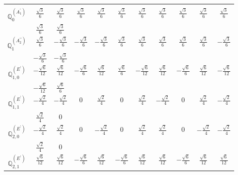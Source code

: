 \documentclass[fleqn,10pt,landscape]{article}
\begin{document}
\begin{itemize}
{\begin{center}
\begin{longtable}{ccccccccccc}
 \hline \hline
\multicolumn{10}{r}{} \\ \endlastfoot

$\mathbb{Q}_{0}^{(A_{1}^{\prime})}$ & $ \frac{\sqrt{3}}{6} $ & $ \frac{\sqrt{3}}{6} $ & $ \frac{\sqrt{3}}{6} $ & $ \frac{\sqrt{3}}{6} $ & $ \frac{\sqrt{3}}{6} $ & $ \frac{\sqrt{3}}{6} $ & $ \frac{\sqrt{3}}{6} $ & $ \frac{\sqrt{3}}{6} $ & $ \frac{\sqrt{3}}{6} $ & $ \frac{\sqrt{3}}{6} $ \\
& $ \frac{\sqrt{3}}{6} $ & $ \frac{\sqrt{3}}{6} $ & $  $ & $  $ & $  $ & $  $ & $  $ & $  $ & $  $ & $  $ \\ \hline
$\mathbb{Q}_{1}^{(A_{2}^{\prime\prime})}$ & $ \frac{\sqrt{3}}{6} $ & $ - \frac{\sqrt{3}}{6} $ & $ - \frac{\sqrt{3}}{6} $ & $ - \frac{\sqrt{3}}{6} $ & $ \frac{\sqrt{3}}{6} $ & $ \frac{\sqrt{3}}{6} $ & $ \frac{\sqrt{3}}{6} $ & $ \frac{\sqrt{3}}{6} $ & $ \frac{\sqrt{3}}{6} $ & $ - \frac{\sqrt{3}}{6} $ \\
& $ - \frac{\sqrt{3}}{6} $ & $ - \frac{\sqrt{3}}{6} $ & $  $ & $  $ & $  $ & $  $ & $  $ & $  $ & $  $ & $  $ \\ \hline
$\mathbb{Q}_{1,0}^{(E^{\prime})}$ & $ - \frac{\sqrt{6}}{12} $ & $ \frac{\sqrt{6}}{12} $ & $ - \frac{\sqrt{6}}{6} $ & $ \frac{\sqrt{6}}{12} $ & $ \frac{\sqrt{6}}{6} $ & $ - \frac{\sqrt{6}}{12} $ & $ \frac{\sqrt{6}}{12} $ & $ - \frac{\sqrt{6}}{6} $ & $ \frac{\sqrt{6}}{12} $ & $ - \frac{\sqrt{6}}{12} $ \\
& $ - \frac{\sqrt{6}}{12} $ & $ \frac{\sqrt{6}}{6} $ & $  $ & $  $ & $  $ & $  $ & $  $ & $  $ & $  $ & $  $ \\ \hline
$\mathbb{Q}_{1,1}^{(E^{\prime})}$ & $ - \frac{\sqrt{2}}{4} $ & $ - \frac{\sqrt{2}}{4} $ & $ 0 $ & $ \frac{\sqrt{2}}{4} $ & $ 0 $ & $ \frac{\sqrt{2}}{4} $ & $ - \frac{\sqrt{2}}{4} $ & $ 0 $ & $ \frac{\sqrt{2}}{4} $ & $ - \frac{\sqrt{2}}{4} $ \\
& $ \frac{\sqrt{2}}{4} $ & $ 0 $ & $  $ & $  $ & $  $ & $  $ & $  $ & $  $ & $  $ & $  $ \\ \hline
$\mathbb{Q}_{2,0}^{(E^{\prime})}$ & $ - \frac{\sqrt{2}}{4} $ & $ \frac{\sqrt{2}}{4} $ & $ 0 $ & $ - \frac{\sqrt{2}}{4} $ & $ 0 $ & $ \frac{\sqrt{2}}{4} $ & $ \frac{\sqrt{2}}{4} $ & $ 0 $ & $ - \frac{\sqrt{2}}{4} $ & $ - \frac{\sqrt{2}}{4} $ \\
& $ \frac{\sqrt{2}}{4} $ & $ 0 $ & $  $ & $  $ & $  $ & $  $ & $  $ & $  $ & $  $ & $  $ \\ \hline
$\mathbb{Q}_{2,1}^{(E^{\prime})}$ & $ \frac{\sqrt{6}}{12} $ & $ \frac{\sqrt{6}}{12} $ & $ - \frac{\sqrt{6}}{6} $ & $ \frac{\sqrt{6}}{12} $ & $ - \frac{\sqrt{6}}{6} $ & $ \frac{\sqrt{6}}{12} $ & $ \frac{\sqrt{6}}{12} $ & $ - \frac{\sqrt{6}}{6} $ & $ \frac{\sqrt{6}}{12} $ & $ \frac{\sqrt{6}}{12} $ \\

\end{longtable}
\end{center}}
\end{itemize}
\end{document}
